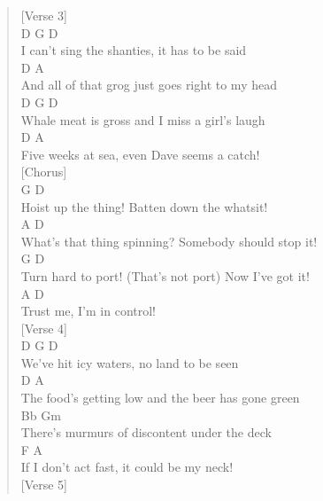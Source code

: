 \documentclass[11pt]{article}
\begin{document}
\begin{verse}
\vspace*{1em}
[Verse 3]\\
\hspace*{2em}D                           G         D\\
I can't sing the shanties, it has to be said\\
\hspace*{4em}D                          A\\
And all of that grog just goes right to my head\\
D                       G               D\\
Whale meat is gross and I miss a girl's laugh\\
D                       A\\
Five weeks at sea, even Dave seems a catch!\\
\vspace*{1em}
[Chorus]\\
G                   D\\
Hoist up the thing! Batten down the whatsit!\\
\hspace*{1em}A                              D\\
What's that thing spinning? Somebody should stop it!\\
G                                    D\\
Turn hard to port! (That's not port) Now I've got it!\\
A                    D\\
Trust me, I'm in control!\\
\vspace*{1em}
[Verse 4]\\
D                        G          D\\
We've hit icy waters, no land to be seen\\
D                              A\\
The food's getting low and the beer has gone green\\
\hspace*{8em}Bb                    Gm\\
There's murmurs of discontent under the deck\\
\hspace*{4em}F                    A\\
If I don't act fast, it could be my neck!\\
\vspace*{1em}
[Verse 5]\\

\end{verse}
\end{document}
